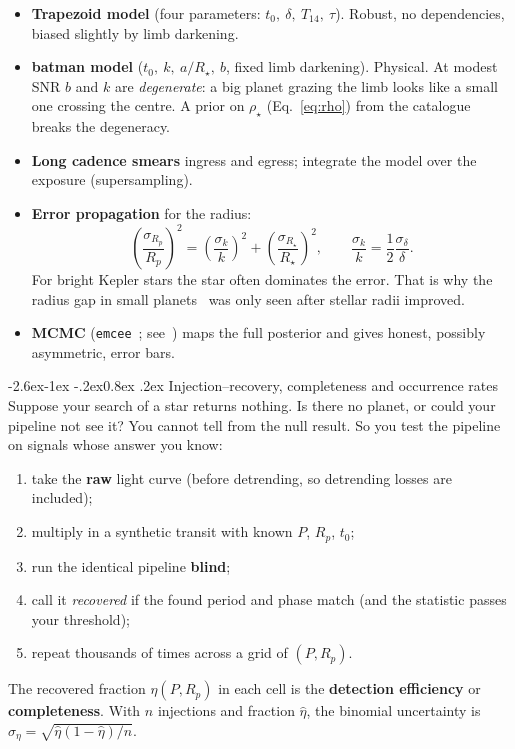 \documentclass[11pt,a4paper]{article}
\makeatletter
\renewcommand\subsection{\@startsection{subsection}{2}{\z@}%
  {-2.6ex\@plus -1ex \@minus -.2ex}{0.8ex \@plus .2ex}%
  {\normalfont\sffamily\Large\bfseries\color{navy}}}
\newcommand{\pkg}[1]{\texttt{#1}}
\makeatother
\begin{document}
\begin{itemize}
  \item \textbf{Trapezoid model} (four parameters: \(t_0,\ \delta,\ T_{14},\ \tau\)). Robust, no dependencies, biased slightly by limb darkening.
  \item \textbf{batman model} (\(t_0,\ k,\ a/R_\star,\ b\), fixed limb darkening). Physical. At modest SNR \(b\) and \(k\) are
        \emph{degenerate}: a big planet grazing the limb looks like a small one crossing the centre. A prior on \(\rho_\star\)
        (Eq.~\ref{eq:rho}) from the catalogue breaks the degeneracy.
  \item \textbf{Long cadence smears} ingress and egress; integrate the model over the exposure (supersampling).
  \item \textbf{Error propagation} for the radius:
  \begin{equation}
    \left(\frac{\sigma_{R_p}}{R_p}\right)^2 = \left(\frac{\sigma_k}{k}\right)^2 + \left(\frac{\sigma_{R_\star}}{R_\star}\right)^2,
    \qquad \frac{\sigma_k}{k} = \frac12\frac{\sigma_\delta}{\delta}.
  \end{equation}
  For bright Kepler stars the star often dominates the error. That is why the radius gap in small planets~\citep{Fulton2017}
  was only seen after stellar radii improved.
  \item \textbf{MCMC} (\pkg{emcee}~\citep{ForemanMackey2013}; see~\citep{HoggForemanMackey2018}) maps the full posterior and gives
        honest, possibly asymmetric, error bars.
\end{itemize}

\subsection{Injection--recovery, completeness and occurrence rates}
\label{sec:injrec}
Suppose your search of a star returns nothing. Is there no planet, or could your pipeline not see it? You cannot tell from the
null result. So you test the pipeline on signals whose answer you know:
\begin{enumerate}
  \item take the \textbf{raw} light curve (before detrending, so detrending losses are included);
  \item multiply in a synthetic transit with known \(P\), \(R_p\), \(t_0\);
  \item run the identical pipeline \textbf{blind};
  \item call it \emph{recovered} if the found period and phase match (and the statistic passes your threshold);
  \item repeat thousands of times across a grid of \((P, R_p)\).
\end{enumerate}
The recovered fraction \(\eta(P,R_p)\) in each cell is the \textbf{detection efficiency} or \textbf{completeness}. With \(n\)
injections and fraction \(\hat\eta\), the binomial uncertainty is \(\sigma_\eta = \sqrt{\hat\eta(1-\hat\eta)/n}\).
\end{document}
